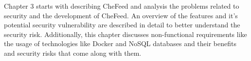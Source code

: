 Chapter 3 starts with describing CheFeed and analysis the problems related to security and the development of CheFeed. An overview of the features and it's potential security vulnerability are described in detail to better understand the security risk. Additionally, this chapter discusses non-functional requirements like the usage of technologies like Docker and NoSQL databases and their benefits and security risks that come along with them.
